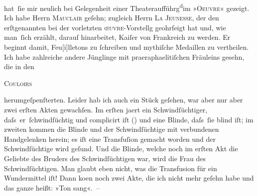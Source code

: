                hat ſie mir neulich bei Gelegenheit einer Theateraufführg\substVorne{}\textsuperscript{d}\substDazwischen{}im\substHinten{} »\textsc{Oeuvre}« gezeigt. Ich habe Herrn {\pb}\textsc{Mauclair} geſehn; zugleich Herrn \textsc{La Jeunesse}, der den erſtgenannten bei der vorletzten \textsc{œuvre}-Vorstellg geohrfeigt hat und, wie man ſich erzählt, darauf hinarbeitet, Kaiſer
               von Frankreich zu werden. Er beginnt damit,
                  Feu{[}i{]}lletons zu{ }ſchreiben und mythiſche Medaillen zu
               vertheilen. Ich habe zahlreiche andere Jünglinge mit praeraphaelitiſchen Fräuleins
               gesehn, die in den \begin{otherlanguage}{french}\textsc{Couloirs}\end{otherlanguage} herumgeſpenſterten. Leider hab ich auch ein Stück geſehen, war aber nur aber zwei erſten Akten gewachſen. Im erſten ja{\geminationm}ert {\pb}ein
               Schwindſüchtiger, daſs er ſchwindſüchtig und complicirt iſt (\label{K_L04111-1v}\label{K_L04111-1})
               und eine Blinde, daſs ſie blind iſt; im zweiten kommen die Blinde und der
               Schwindſüchtige mit verbundenen Handgelenken herein; es iſt eine Transfuſion gemacht
               worden und der Schwindſüchtige wird geſund. Und die Blinde, welche noch im erſten Akt
               die Geliebte des Bruders des Schwindſüchtigen war, wird die Frau des
               Schwindſüchtigen. Man glaubt eben nicht, was die {\pb}Transfusion für ein Wundermittel iſt!
               Dann ko{\geminationm}en noch zwei Akte, die ich nicht mehr geſehn
               habe und das ganze heißt: »Ton sang«. –\pend
           
